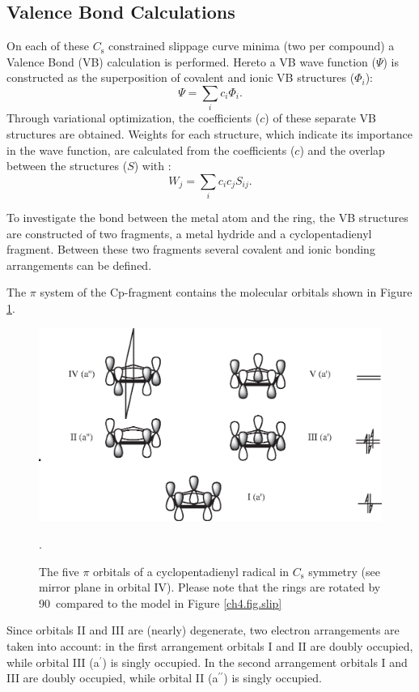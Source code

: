 \subsection{Valence Bond Calculations}

On each of these $C_\mathrm{s}$ constrained slippage curve minima (two per compound) a Valence Bond (VB) calculation is performed. Hereto a VB wave function ($\Psi$) is constructed as the superposition of covalent and ionic VB structures ($\Phi_i$):
\begin{equation}
\Psi = \sum_{i} c_{i}\Phi{_i}.
\label{ch4.eq.psi}
\end{equation}
Through variational optimization, the coefficients ($c$) of these separate VB structures are obtained.
Weights for each structure, which indicate its importance in the wave function, are calculated from the coefficients ($c$) and the overlap between the structures ($S$) with \cite{coulson}:
\begin{equation}
W_{j}=\sum_{i} c_{i}c_{j}S_{ij}.
\label{ch4.eq.weight}
\end{equation}

To investigate the bond between the metal atom and the ring, the VB structures are constructed of two fragments, a metal hydride and a cyclopentadienyl fragment.  Between these two fragments several covalent and ionic bonding arrangements can be defined.

The $\pi$ system of the Cp-fragment contains the molecular orbitals shown in Figure \ref{ch4.fig.cporbs}.
\begin{figure}[htbp]
\center
\includegraphics[scale=0.7]{cyclopentadienyl/figures/cp-orbitals.eps}
\caption{The five $\pi$ orbitals of a cyclopentadienyl radical in $C_\mathrm{s}$ symmetry (see mirror plane in orbital IV). Please note that the rings are rotated by 90\degrees\ compared to the model in Figure \ref{ch4.fig.slip}}.
\label{ch4.fig.cporbs}
\end{figure}
Since orbitals II and III are (nearly) degenerate, two electron arrangements are taken into account: in the first arrangement orbitals I and II are doubly occupied, while orbital III (a$^\prime$) is singly occupied. In the second arrangement orbitals I and III are doubly occupied, while orbital II (a$^{\prime\prime}$) is singly occupied. 

